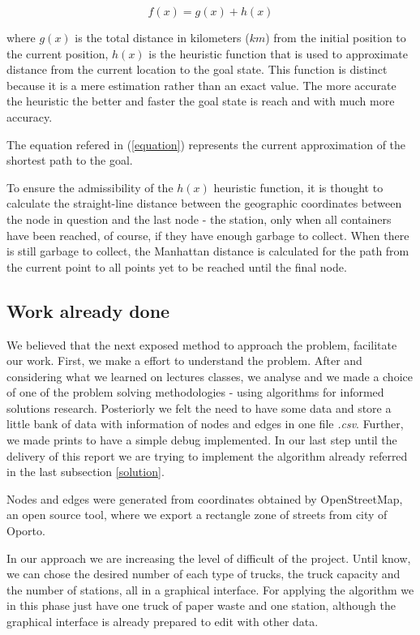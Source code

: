 \documentclass[a4paper]{article}
\begin{document}
\begin{equation}\label{equation}
f(x) = g(x) + h(x)
\end{equation}

where $g(x)$ is the total distance in kilometers ($km$) from the initial position to the current position, $h(x)$ is the heuristic function that is used to approximate distance from the current location to the goal state. This function is distinct because it is a mere estimation rather than an exact value. The more accurate the heuristic the better and faster the goal state is reach and with much more accuracy.

The equation refered in (\ref{equation}) represents the current approximation of the shortest path to the goal. 

To ensure the admissibility of the $h(x)$ heuristic function, it is thought to calculate the straight-line distance between the geographic coordinates between the node in question and the last node - the station, only when all containers have been reached, of course, if they have enough garbage to collect.
When there is still garbage to collect, the Manhattan distance is calculated for the path from the current point to all points yet to be reached until the final node.

\subsection{Work already done}

We believed that the next exposed method to approach the problem, facilitate our work. First, we make a effort to understand the problem. After and considering what we learned on lectures classes, we analyse and we made a choice of one of the problem solving methodologies - using algorithms for informed solutions research. 
Posteriorly we felt the need to have some data and store a little bank of data with information of nodes and edges in one file \emph{.csv}.
Further, we made prints to have a simple debug implemented. 
In our last step until the delivery of this report we are trying to implement the algorithm already referred in the last subsection \ref{solution}.

Nodes and edges were generated from coordinates obtained by OpenStreetMap, an open source tool, where we export a rectangle zone of streets from city of Oporto. 

In our approach we are increasing the level of difficult of the project. Until know, we can chose the desired number of each type of trucks, the truck capacity and the number of stations, all in a graphical interface. For applying the algorithm we in this phase just have one truck of paper waste and one station, although the graphical interface is already prepared to edit with other data. 
\end{document}
